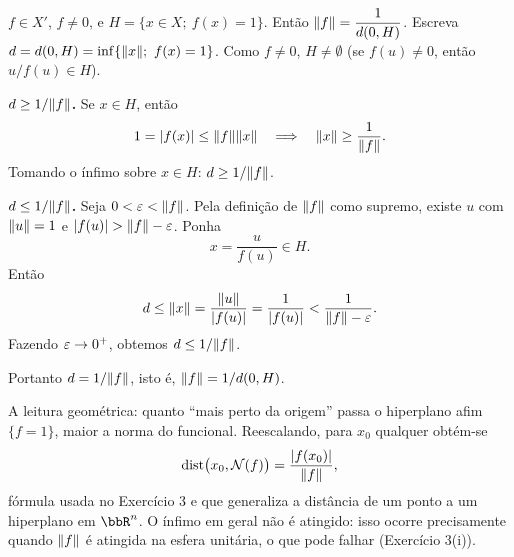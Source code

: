 \begin{exercicio}{$f\in X'$, $f\neq0$, e $H=\{x\in X;\ f(x)=1\}$. Então $\lVert f\rVert=\dfrac{1}{d(0,H)}$.}
\sol
Escreva $d=d(0,H)=\inf\{\lVert x\rVert;\ f(x)=1\}$. Como $f\neq0$, $H\neq\emptyset$ (se $f(u)\neq0$, então $u/f(u)\in H$).

\textbf{$d\ge1/\lVert f\rVert$.} Se $x\in H$, então
\[ 1=\lvert f(x)\rvert\le\lVert f\rVert\lVert x\rVert \quad\Longrightarrow\quad \lVert x\rVert\ge\frac{1}{\lVert f\rVert}. \]
Tomando o ínfimo sobre $x\in H$: $d\ge1/\lVert f\rVert$.

\textbf{$d\le1/\lVert f\rVert$.} Seja $0<\varepsilon<\lVert f\rVert$. Pela definição de $\lVert f\rVert$ como supremo, existe $u$ com $\lVert u\rVert=1$ e $\lvert f(u)\rvert>\lVert f\rVert-\varepsilon$. Ponha
\[ x=\frac{u}{f(u)}\in H . \]
Então
\[ d\le\lVert x\rVert=\frac{\lVert u\rVert}{\lvert f(u)\rvert}=\frac{1}{\lvert f(u)\rvert}<\frac{1}{\lVert f\rVert-\varepsilon}. \]
Fazendo $\varepsilon\to0^+$, obtemos $d\le1/\lVert f\rVert$.

Portanto $d=1/\lVert f\rVert$, isto é, $\lVert f\rVert=1/d(0,H)$.

\begin{obs}
A leitura geométrica: quanto ``mais perto da origem'' passa o hiperplano afim $\{f=1\}$, maior a norma do funcional. Reescalando, para $x_0$ qualquer obtém-se
\[ \operatorname{dist}\bigl(x_0,\mathcal{N}(f)\bigr)=\frac{\lvert f(x_0)\rvert}{\lVert f\rVert}, \]
fórmula usada no Exercício 3 e que generaliza a distância de um ponto a um hiperplano em $\R^n$. O ínfimo em geral não é atingido: isso ocorre precisamente quando $\lVert f\rVert$ é atingida na esfera unitária, o que pode falhar (Exercício 3(i)).
\end{obs}
\end{exercicio}

